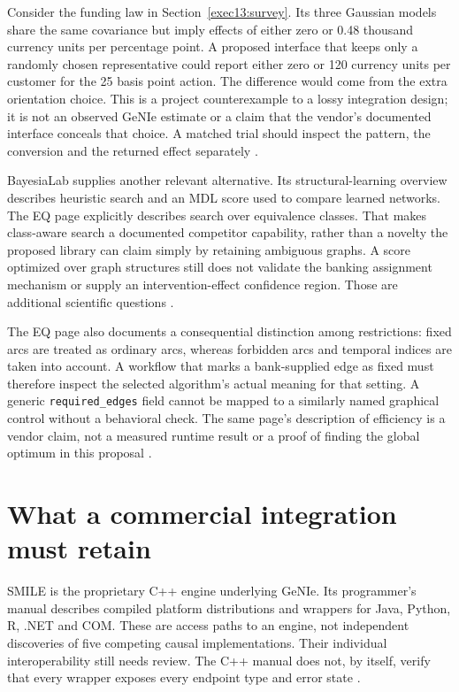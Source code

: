 Consider the funding law in Section~\ref{exec13:survey}. Its three Gaussian
models share the same covariance but imply effects of either zero or 0.48
thousand currency units per percentage point. A proposed interface that keeps
only a randomly chosen representative could report either zero or 120 currency
units per customer for the 25 basis point action. The difference would come
from the extra orientation choice. This is a project counterexample to a
lossy integration design; it is not an observed GeNIe estimate or a claim
that the vendor's documented interface conceals that choice. A matched trial
should inspect the pattern, the conversion and the returned effect separately
\citep{exec13_examples}.

BayesiaLab supplies another relevant alternative. Its structural-learning
overview describes heuristic search and an MDL score used to compare learned
networks. The EQ page explicitly describes search over equivalence classes.
That makes class-aware search a documented competitor capability, rather
than a novelty the proposed library can claim simply by retaining ambiguous
graphs. A score optimized over graph structures still does not validate
the banking assignment mechanism or supply an intervention-effect confidence
region. Those are additional scientific questions
\citep{exec13_bayesia_structure,exec13_bayesia_eq}.

The EQ page also documents a consequential distinction among restrictions:
fixed arcs are treated as ordinary arcs, whereas forbidden arcs and temporal
indices are taken into account. A workflow that marks a bank-supplied edge
as fixed must therefore inspect the selected algorithm's actual meaning for
that setting. A generic \texttt{required\_edges} field cannot be mapped to a
similarly named graphical control without a behavioral check. The same page's
description of efficiency is a vendor claim, not a measured runtime result
or a proof of finding the global optimum in this proposal
\citep{exec13_bayesia_eq}.

\section{What a commercial integration must retain}

SMILE is the proprietary C++ engine underlying GeNIe. Its programmer's manual
describes compiled platform distributions and wrappers for Java, Python, R,
.NET and COM. These are access paths to an engine, not independent discoveries
of five competing causal implementations. Their individual interoperability
still needs review. The C++ manual does not, by itself, verify that every
wrapper exposes every endpoint type and error state
\citep{exec13_smile_intro}.

